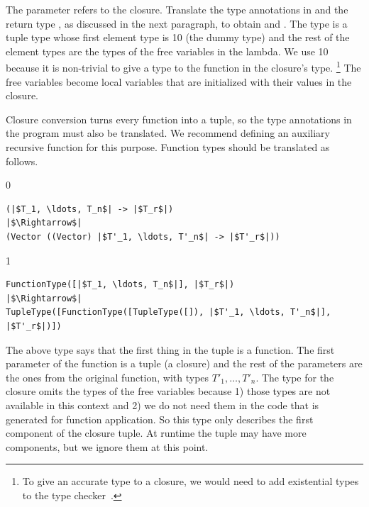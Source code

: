 \documentclass[7x10,nocrop]{TimesAPriori_MIT}%
\def\racketEd{0}
\def\pythonEd{1}
\def\edition{0}
\newcommand{\racket}[1]{{\if\edition\racketEd{#1}\fi}}
\newcommand{\python}[1]{{\if\edition\pythonEd #1\fi}}
\begin{document}
The  parameter refers to the closure.  Translate the type
annotations in  and the return type , as discussed in
the next paragraph, to obtain  and .  The type
 is a tuple type whose first element type is
\python{}\racket{\code{\_} (the dummy type)} and the rest of
the element types are the types of the free variables in the
lambda. We use \python{}\racket{\code{\_}} because it
is non-trivial to give a type to the function in the closure's type.%
%
\footnote{To give an accurate type to a closure, we would need to add
  existential types to the type checker~\citep{Minamide:1996ys}.}
%
The free variables become local variables that are initialized with
their values in the closure.

Closure conversion turns every function into a tuple, so the type
annotations in the program must also be translated.  We recommend
defining an auxiliary recursive function for this purpose.  Function
types should be translated as follows.
%
{\if\edition\racketEd
\begin{lstlisting}
(|$T_1, \ldots, T_n$| -> |$T_r$|)
|$\Rightarrow$|  
(Vector ((Vector) |$T'_1, \ldots, T'_n$| -> |$T'_r$|))
\end{lstlisting}
\fi}
{\if\edition\pythonEd
\begin{lstlisting}
FunctionType([|$T_1, \ldots, T_n$|], |$T_r$|)
|$\Rightarrow$|  
TupleType([FunctionType([TupleType([]), |$T'_1, \ldots, T'_n$|], |$T'_r$|)])
\end{lstlisting}
\fi}
%
The above type says that the first thing in the tuple is a
function. The first parameter of the function is a tuple (a closure)
and the rest of the parameters are the ones from the original
function, with types $T'_1, \ldots, T'_n$.  The type for the closure
omits the types of the free variables because 1) those types are not
available in this context and 2) we do not need them in the code that
is generated for function application. So this type only describes the
first component of the closure tuple. At runtime the tuple may have
more components, but we ignore them at this point.
\end{document}
